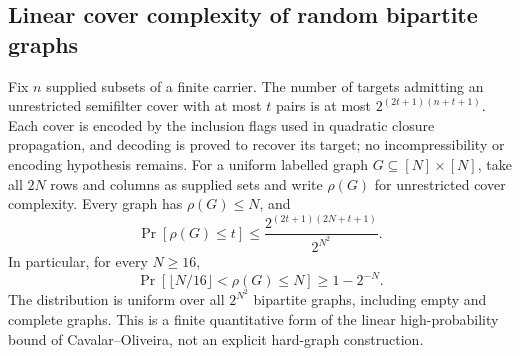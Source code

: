 \begin{result}
\subsection{Linear cover complexity of random bipartite graphs}
Fix $n$ supplied subsets of a finite carrier. The number of targets admitting
an unrestricted semifilter cover with at most $t$ pairs is at most
$2^{(2t+1)(n+t+1)}$. Each cover is encoded by the inclusion flags used in
quadratic closure propagation, and decoding is proved to recover its target;
no incompressibility or encoding hypothesis remains.
For a uniform labelled graph $G\subseteq[N]\times[N]$, take all $2N$ rows and
columns as supplied sets and write $\rho(G)$ for unrestricted cover complexity.
Every graph has $\rho(G)\le N$, and
\[
\Pr[\rho(G)\le t]\le\frac{2^{(2t+1)(2N+t+1)}}{2^{N^2}}.
\]
In particular, for every $N\ge16$,
\[
\Pr[\lfloor N/16\rfloor<\rho(G)\le N]\ge1-2^{-N}.
\]
The distribution is uniform over all $2^{N^2}$ bipartite graphs, including
empty and complete graphs. This is a finite quantitative form of the
linear high-probability bound of Cavalar--Oliveira, not an explicit hard-graph
construction.\citep{CavalarOliveira2025}
\end{result}

